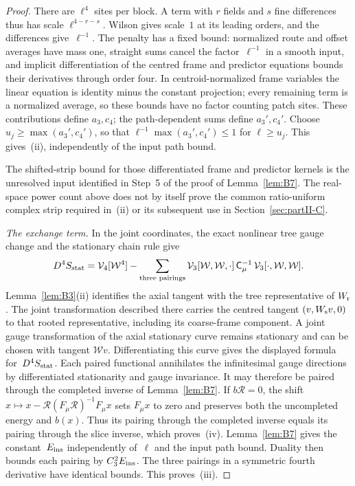 \begin{proof}
There are $\ell^4$ sites per block. A term with $r$ fields and $s$ fine differences thus has scale $\ell^{4-r-s}$. Wilson gives scale~$1$ at its leading orders, and the differences give~$\ell^{-1}$. The penalty has a fixed bound: normalized route and offset averages have mass one, straight sums cancel the factor~$\ell^{-1}$ in a smooth input, and implicit differentiation of the centred frame and predictor equations bounds their derivatives through order four. In centroid-normalized frame variables the linear equation is identity minus the constant projection; every remaining term is a normalized average, so these bounds have no factor counting patch sites. These contributions define $a_3,c_4$; the path-dependent sums define $a_3',c_4'$. Choose $u_j\ge\max(a_3',c_4')$, so that $\ell^{-1}\max(a_3',c_4')\le1$ for $\ell\ge u_j$. This gives~(ii), independently of the input path bound.

The shifted-strip bound for those differentiated frame and predictor kernels is the unresolved input identified in Step~5 of the proof of Lemma~\ref{lem:B7}. The real-space power count above does not by itself prove the common ratio-uniform complex strip required in~(ii) or its subsequent use in Section~\ref{sec:partII-C}.

\emph{The exchange term.} In the joint coordinates, the exact nonlinear tree gauge change and the stationary chain rule give
\begin{equation*}
D^4S_{\rm stat}=\mathcal V_4[\mathcal W^4]
 -\sum_{\text{three pairings}}\mathcal V_3[\mathcal W,\mathcal W,\cdot]\,
 \mathsf C_\mu^{-1}\,\mathcal V_3[\cdot,\mathcal W,\mathcal W].
\end{equation*}
Lemma~\ref{lem:B3}(ii) identifies the axial tangent with the tree representative of $W_{\rm r}$. The joint transformation described there carries the centred tangent $(v,W_{\rm s}v,0)$ to that rooted representative, including its coarse-frame component. A joint gauge transformation of the axial stationary curve remains stationary and can be chosen with tangent $\mathcal Wv$. Differentiating this curve gives the displayed formula for~$D^4S_{\rm stat}$. Each paired functional annihilates the infinitesimal gauge directions by differentiated stationarity and gauge invariance. It may therefore be paired through the completed inverse of Lemma~\ref{lem:B7}. If $b\mathcal R=0$, the shift $x\mapsto x-\mathcal R(F_\mu\mathcal R)^{-1}F_\mu x$ sets $F_\mu x$ to zero and preserves both the uncompleted energy and $b(x)$. Thus its pairing through the completed inverse equals its pairing through the slice inverse, which proves~(iv). Lemma~\ref{lem:B7} gives the constant~$E_{\rm ins}$ independently of~$\ell$ and the input path bound. Duality then bounds each pairing by $C_3^2E_{\rm ins}$. The three pairings in a symmetric fourth derivative have identical bounds. This proves~(iii).
\end{proof}

